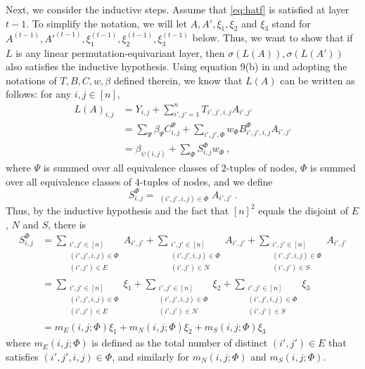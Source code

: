 \documentclass{article}
\begin{document}
Next, we consider the inductive steps. Assume that \eqref{eq:hatf} is satisfied at layer $t-1$. To simplify the notation, we will let $A, A', \xi_1, \xi_2$ and $\xi_3$ stand for $A^{(t-1)}, A'^{(t-1)}, \xi_1^{(t-1)}, \xi_2^{(t-1)}, \xi_3^{(t-1)}$ below. Thus, we want to show that if $L$ is any linear permutation-equivariant layer, then $\sigma(L(A)), \sigma(L(A'))$ also satisfies the inductive hypothesis. 
Using equation 9(b) in \cite{maron2018invariant} and adopting the notations of $T, B, C, w, \beta$ defined therein, we know that $L(A)$ can be written as follows: for any $i, j \in [n]$,
\begin{equation*}
    \begin{split}
        L(A)_{i, j} &= Y_{i, j} + \sum_{i', j' = 1}^{n} T_{i', j', i, j} A_{i', j'} \\
        &= \sum_{\Psi} \beta_{\Psi} C_{i, j}^{\Psi} + \sum_{i', j', \Phi} w_{\Phi} B_{i', j', i, j}^{\Phi} A_{i', j'} \\
        &= \beta_{\psi(i, j)} + \sum_\Phi S^{\Phi}_{i, j} w_\Phi~,
    \end{split}
\end{equation*}
where $\Psi$ is summed over all equivalence classes of $2$-tuples of nodes, $\Phi$ is summed over all equivalence classes of $4$-tuples of nodes, and we define
\begin{equation*}
    S^{\Phi}_{i, j} = \mathop{\sum_{i', j' \in [n]}}_{(i', j', i, j) \in \Phi} A_{i', j'}~.
\end{equation*}
Thus, by the inductive hypothesis and the fact that $[n]^2$ equals the disjoint of $E$, $N$ and $S$, there is 
\begin{equation}
\label{eq:S}
\begin{split}
    S^{\Phi}_{i, j} &= \sum_{\substack{i', j' \in [n] \\ (i', j', i, j) \in \Phi \\ (i', j') \in E}} A_{i', j'} + \sum_{\substack{i', j' \in [n] \\ (i', j', i, j) \in \Phi \\ (i', j') \in N}} A_{i', j'} + \sum_{\substack{i', j' \in [n] \\ (i', j', i, j) \in \Phi \\ (i', j') \in S}} A_{i', j'} \\
    &= \sum_{\substack{i', j' \in [n] \\ (i', j', i, j) \in \Phi \\ (i', j') \in E}} \xi_1 + \sum_{\substack{i', j' \in [n] \\ (i', j', i, j) \in \Phi \\ (i', j') \in N}} \xi_2 + \sum_{\substack{i', j' \in [n] \\ (i', j', i, j) \in \Phi \\ (i', j') \in S}} \xi_3 \\
    &= m_E(i, j; \Phi) \xi_1 + m_N(i, j; \Phi) \xi_2 + m_S(i, j; \Phi) \xi_3
\end{split}
\end{equation}
where $m_E(i, j; \Phi)$ is defined as the total number of distinct $(i', j') \in E$ that satisfies $(i', j', i, j) \in \Phi$, and similarly for $m_N(i, j; \Phi)$ and $m_S(i, j; \Phi)$. 
\end{document}
